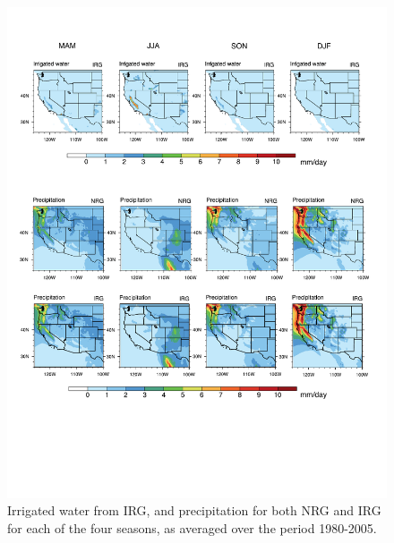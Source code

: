 \begin{figure}
\begin{center}
\includegraphics[width=6in]{supplement/irrigated_water_and_precipitation_4seasons.pdf}
\caption{Irrigated water from IRG, and precipitation for both NRG and IRG for each of the four seasons, as averaged over the period 1980-2005.}
\end{center}
\end{figure}

